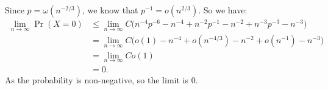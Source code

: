 \documentclass{homework}
\begin{document}
\begin{solution}
Since $p=\omega(n^{-2/3})$, we know that $p^{-1} = o(n^{2/3})$. So we have:
\begin{align*}
  \lim_{n \to \infty}\Pr(X=0) &\le\lim_{n \to \infty}C\bigl( n^{-4}p^{-6}- n^{-4} + n^{-2}p^{-1} - n^{-2} + n^{-3}p^{-3} - n^{-3} \bigr)\\
  &= \lim_{n \to \infty}C\bigl(o(1)-n^{-4} + o(n^{-4/3})-n^{-2} + o(n^{-1}) - n^{-3}\bigr) \\
  &= \lim_{n \to \infty}Co(1) \\
  &= 0.
\end{align*}
As the probability is non-negative, so the limit is $0$.
\end{solution}
\end{document}
